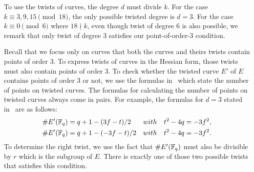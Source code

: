 To use the twists of curves, the degree $d$ must divide $k$.
For the case $k \equiv 3,9,15 \pmod{18}$,
the only possible twisted degree is $d = 3$.
For the case $k \equiv 0 \pmod{6}$ where $18 \nmid k$,
even though twist of degree 6 is also possible,
we remark that only twist of degree $3$ satisfies our point-of-order-3 condition.

Recall that we focus only on curves that both the curves and theirs twists contain points of order 3.
To express twists of curves in the Hessian form,
those twists must also contain points of order 3.
To check whether the twisted curve $E'$ of $E$ contains points of order 3 or not,
we use the formulas in~\cite{2006/hess} which state the number of points on twisted curves.
The formulas for calculating the number of points on twisted curves always come in pairs.
For example, the formulas for $d = 3$ stated in~\cite{2006/hess} are as follows:
\begin{align*}
\# E' (\mathbb{F}_{q}) &= q + 1 - (3f - t) / 2 & with & \quad t^2 - 4q = -3f^2, \\
\# E' (\mathbb{F}_{q}) &= q + 1 - (-3f- t) / 2 & with & \quad t^2 - 4q = -3f^2.
\end{align*}
To determine the right twist,
we use the fact that $\#E'(\mathbb{F}_{q})$ must also be divisible by $r$ which is the subgroup of $E$.
There is exactly one of those two possible twists that satisfies this condition.



